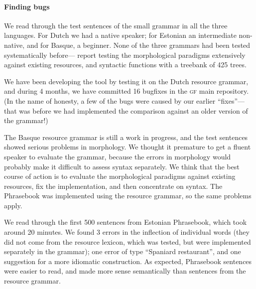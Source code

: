 \documentclass[11pt]{article}
\def\gf{\textsc{gf}}
\newcommand{\todo}[1]{{\color{cyan}\textbf{[TODO: }#1\textbf{]}}}
\begin{document}




\paragraph{Finding bugs} 
We read through the test sentences of the small grammar in all the
three languages. 
For Dutch we had a native speaker; for Estonian an intermediate non-native,
and for Basque, a beginner. None of the three grammars had been tested
systematically before---\cite{listenmaa_kaljurand2014} report testing
the morphological paradigms extensively against existing resources,
and syntactic functions with a treebank of 425 trees.

We have been developing the tool by testing it on the Dutch resource
grammar, and during 4 months, we have committed 16 bugfixes in the
\gf{} main repository. (In the name of honesty, a few of the bugs were
caused by our earlier ``fixes''---that was before we had implemented
the comparison against an older version of the grammar!) 

The Basque resource grammar is still a work in progress, and the
test sentences showed serious problems in morphology.
We thought it premature to get a fluent speaker to evaluate the grammar,
because the errors in morphology would probably make it
difficult to assess syntax separately. We think that the best course
of action is to evaluate the morphological paradigms against existing
resources, fix the implementation, and then concentrate on syntax.
The Phrasebook was implemented using the resource grammar, so the
same problems apply.

We read through the first 500 sentences from Estonian Phrasebook,
which took around 20 minutes. We found 3 errors in the inflection of
individual words (they did not come from the resource lexicon, which
was tested, but were implemented separately in the grammar); one error
of type ``Spaniard restaurant'', and one suggestion for a more idiomatic
construction. As expected, Phrasebook sentences were easier to read,
and made more sense semantically than sentences from the resource
grammar. %
\end{document}
